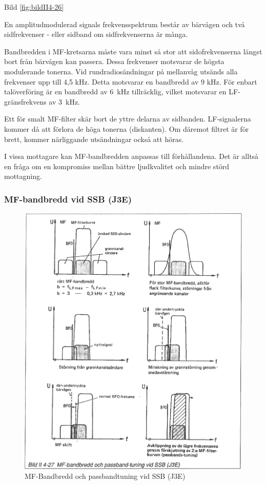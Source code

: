 Bild \ref{fig:bildII4-26}

En amplitudmodulerad signals frekvensspektrum består av bärvågen och
två sidfrekvenser - eller sidband om sidfrekvenserna är många.

Bandbredden i MF-kretsarna måste vara minst så stor att
sidofrekvenserna längst bort från bärvågen kan passera. Dessa
frekvenser motsvarar de högsta modulerande tonerna. Vid
rundradiosändningar på mellanvåg utsänds alla frekvenser upp till 4,5
kHz.  Detta motsvarar en bandbredd av 9 kHz.  För enbart talöverföring
är en bandbredd av 6~kHz tillräcklig, vilket motsvarar en
LF-gränsfrekvens av 3~kHz.

Ett för smalt MF-filter skär bort de yttre delarna av
sidbanden. LF-signalerna kommer då att förlora de höga tonerna
(diskanten). Om däremot filtret är för brett, kommer närliggande
utsändningar också att höras.

I vissa mottagare kan MF-bandbredden anpassas till förhållandena. Det
är alltså en fråga om en kompromiss mellan bättre ljudkvalitet och
mindre störd mottagning.

\subsubsection{MF-bandbredd vid SSB (J3E)}

\begin{figure}
  \includegraphics[width=\textwidth]{images/bild_2_4-27}
  \caption{MF-Bandbredd och passbandtuning vid SSB (J3E)}
  \label{fig:bildII4-27}
\end{figure}

